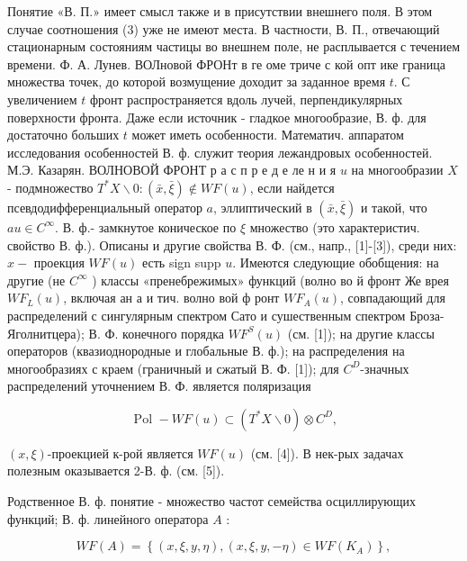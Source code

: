 \documentclass[10pt]{article}
\begin{document}
Понятие «В. П.» имеет смысл также и в присутствии внешнего поля. В этом случае соотношения (3) уже не имеют места. В частности, В. П., отвечающий стационарным состояниям частицы во внешнем поле, не расплывается с течением времени. $Ф$. А. Лунев. ВОЛновой ФРОНт в ге оме триче с кой опт ике граница множества точек, до которой возмущение доходит за заданное время $t$. С увеличением $t$ фронт распространяется вдоль лучей, перпендикулярных поверхности фронта. Даже если источник - гладкое многообразие, В. ф. для достаточно больших $t$ может иметь особенности. Математич. аппаратом исследования особенностей В. ф. служит теория лежандровых особенностей. М.Э. Казарян. ВОЛНОВОЙ ФРОНТ р а с п р е д е ле н и я $u$ на многообразии $X$ - подмножество $T^{*} X \backslash 0:(\bar{x}, \bar{\xi}) \notin W F(u)$, если найдется псевдодифференциальный оператор $a$, эллиптический в $(\bar{x}, \bar{\xi})$ и такой, что $a u \in C^{\infty}$. В. ф.- замкнутое коническое по $\xi$ множество (это характеристич. свойство В. ф.). Описаны и другие свойства В. Ф. (см., напр., [1]-[3]), среди них: $x-$ проекция $W F(u)$ есть sign supp $u$. Имеются следующие обобщения: на другие (не $C^{\infty}$ ) классы «пренебрежимых» функций (волно во й фронт Же врея $W F_{L}(u)$, включая ан а и тич. волно вой ф ронт $W F_{A}(u)$, совпадающий для распределений с сингулярным спектром Сато и сушественным спектром Броза-Яголнитцера); В. Ф. конечного порядка $W F^{S}(u)$ (см. [1]); на другие классы операторов (квазиоднородные и глобальные В. ф.); на распределения на многообразиях с краем (граничный и сжатый В. Ф. [1]); для $C^{D}$-значных распределений уточнением В. Ф. является поляризация



\[

\text { Pol }-W F(u) \subset\left(T^{*} X \backslash 0\right) \otimes C^{D},

\]



$(x, \xi)$-проекцией к-рой является $W F(u)$ (см. [4]). В нек-рых задачах полезным оказывается 2-В. ф. (см. [5]).



Родственное В. ф. понятие - множество частот семейства осциллирующих функций; В. ф. линейного оператора $A$ :



\[

W F(A)=\left\{(x, \xi, y, \eta),(x, \xi, y,-\eta) \in W F\left(K_{A}\right)\right\},

\]
\end{document}
